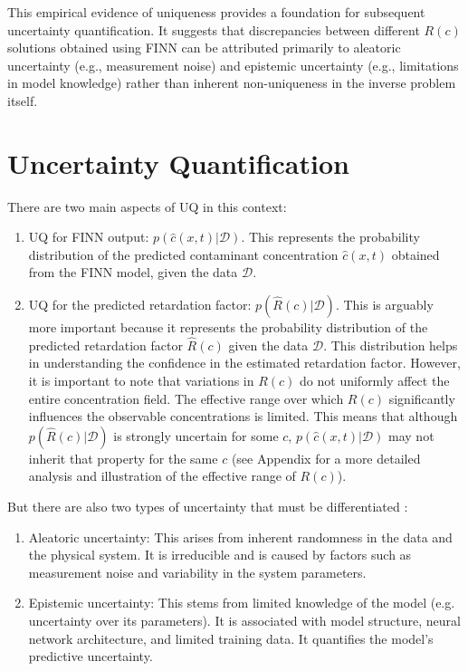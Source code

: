 This empirical evidence of uniqueness provides a foundation for subsequent uncertainty quantification. It suggests that discrepancies between different $R(c)$ solutions obtained using FINN can be attributed primarily to aleatoric uncertainty (e.g., measurement noise) and epistemic uncertainty (e.g., limitations in model knowledge) rather than inherent non-uniqueness in the inverse problem itself.




\section{Uncertainty Quantification}
There are two main aspects of UQ in this context:
\begin{enumerate}
    \item UQ for FINN output: $p(\hat{c}(x,t) | \mathcal{D})$. This represents the probability distribution of the predicted contaminant concentration $\hat{c}(x,t)$ obtained from the FINN model, given the data $\mathcal{D}$.
    \item UQ for the predicted retardation factor: $p(\hat{R}(c) | \mathcal{D})$. This is arguably more important because it represents the probability distribution of the predicted retardation factor $\hat{R}(c)$ given the data $\mathcal{D}$. This distribution helps in understanding the confidence in the estimated retardation factor. However, it is important to note that variations in $R(c)$ do not uniformly affect the entire concentration field. The effective range over which $R(c)$ significantly influences the observable concentrations is limited. This means that although $p(\hat{R}(c) | \mathcal{D})$ is strongly uncertain for some $c$, $p(\hat{c}(x,t) | \mathcal{D})$ may not inherit that property for the same $c$ (see Appendix for a more detailed analysis and illustration of the effective range of $R(c)$).
\end{enumerate}

But there are also two types of uncertainty that must be differentiated \cite{depeweg2018decomposition, gawlikowski2023survey}:

\begin{enumerate}
    \item Aleatoric uncertainty: This arises from inherent randomness in the data and the physical system. It is irreducible and is caused by factors such as measurement noise and variability in the system parameters.
    \item Epistemic uncertainty: This stems from limited knowledge of the model (e.g. uncertainty over its parameters). It is associated with model structure, neural network architecture, and limited training data. It quantifies the model's predictive uncertainty.
\end{enumerate}

